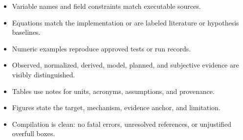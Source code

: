 \documentclass[10pt,a4paper]{article}
\begin{document}
\begin{itemize}
  \item [ ] Variable names and field constraints match executable sources.
  \item [ ] Equations match the implementation or are labeled literature or
    hypothesis baselines.
  \item [ ] Numeric examples reproduce approved tests or run records.
  \item [ ] Observed, normalized, derived, model, planned, and subjective
    evidence are visibly distinguished.
  \item [ ] Tables use notes for units, acronyms, assumptions, and provenance.
  \item [ ] Figures state the target, mechanism, evidence anchor,
    and limitation.
  \item [ ] Compilation is clean: no fatal errors, unresolved references, or
    unjustified overfull boxes.
\end{itemize}
\end{document}
